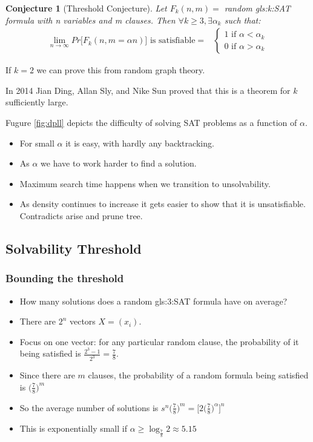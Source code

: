 \documentclass[]{article}
\newtheorem{conj}{Conjecture}
\begin{document}
\begin{conj}[Threshold Conjecture]
	Let $F_k(n,m) = $ random \gls{gls:k:SAT} formula with n variables and m clauses. Then $\forall k \ge 3, \exists \alpha_k$ such that:
	\begin{align*}
		\lim_{n \rightarrow \infty} Pr\big[F_k(n,m=\alpha n)\big]\text{ is satisfiable}=&\begin{cases}
		1 \text{ if } \alpha<\alpha_k\\
		0  \text{ if } \alpha>\alpha_k
		\end{cases}
	\end{align*}
\end{conj}

If $k=2$ we can prove this from random graph theory.

In 2014 Jian Ding, Allan Sly, and Nike Sun proved that this is a theorem for $k$ sufficiently large\cite{ding2015proof}.

Fugure \ref{fig:dpll} depicts the difficulty of solving SAT problems as a function of $\alpha$. \begin{itemize}
	\item For small $\alpha$ it is easy, with hardly any backtracking.
	\item As $\alpha$ we have to work harder to find a solution.
	\item Maximum search time happens when we transition to unsolvability.
	\item As density continues to increase it gets easier to show that it is unsatisfiable. Contradicts arise and prune tree.
\end{itemize}

\subsection{Solvability Threshold}

\subsubsection{Bounding the threshold}
\begin{itemize}
	\item How many solutions does a random \gls{gls:3:SAT} formula have on average?
	\item There are $2^n$ vectors $X=(x_i)$. 
	\item Focus on one vector: for any particular random clause, the probability of it being satisfied is $\frac{2^3-1}{2^3} = \frac{7}{8}$.
	\item Since there are $m$ clauses, the probability of a random formula being satisfied is  $\big(\frac{7}{8}\big)^m$
	\item So the average number of solutions is $s^n\big(\frac{7}{8}\big)^m=\big[2\big(\frac{7}{8}\big)^\alpha\big]^n$
	\item This is exponentially small if $\alpha \ge \log_{\frac{7}{8}}2\approx5.15$
\end{itemize}
\end{document}
